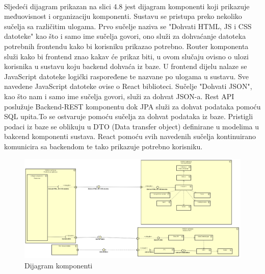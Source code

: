			\textbf{}\\
			Sljedeći dijagram prikazan na slici 4.8 jest dijagram komponenti koji prikazuje međuovisnost i organizaciju komponenti. Sustavu se pristupa preko nekoliko sučelja
            sa različitim ulogama. Prvo sučelje naziva se "Dohvati HTML, JS i CSS datoteke" kao
            što i samo ime sučelja govori, ono služi za dohvaćanje datoteka potrebnih frontendu kako bi korisniku prikazao potrebno. Router komponenta služi kako bi frontend znao
            kakav će prikaz biti, u ovom slučaju ovisno o ulozi korisnika u sustavu koju backend dohvaća iz baze. U frontend dijelu nalaze se JavaScript datoteke logički raspoređene
            te nazvane po ulogama u sustavu. Sve navedene JavaScript datoteke ovise o React 
            biblioteci. Sučelje "Dohvati JSON", kao što nam i samo ime sučelja govori, služi za dohvat JSON-a. Rest API poslužuje Backend-REST komponentu dok JPA služi za dohvat podataka pomoću SQL upita.To se ostvaruje pomoću sučelja za dohvat podataka iz baze.  Pristigli podaci iz baze se oblikuju u DTO (Data transfer object) definirane u modelima u bakcend komponenti sustava. React pomoću svih navedenih sučelja kontinuirano komunicira sa backendom te tako prikazuje potrebno korisniku.

        \begin{figure}[H]
			\hspace*{-1.5cm}
			\includegraphics[scale=0.53]{slike/dokumentacija_dijagrami_dijagram_komponenti.PNG} %
			\centering
			\caption{Dijagram komponenti}
			\label{fig:promjene}
		\end{figure}